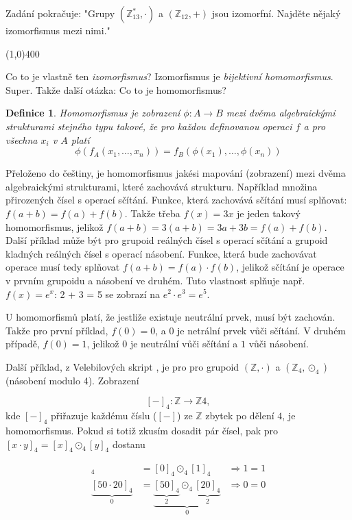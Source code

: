 \documentclass{article}
\newtheorem{definice}{Definice}[section]
\begin{document}
Zadání pokračuje:
"Grupy $(\mathbb{Z}_{13}^{*},\cdot)$ a $(\mathbb{Z}_{12},+)$ jsou izomorfní. Najděte nějaký izomorfismus mezi nimi."

\line(1,0){400}

Co to je vlastně ten \textit{izomorfismus}? Izomorfismus je \textit{bijektivní homomorfismus}. Super. Takže další otázka: Co to je homomorfismus?

\begin{definice}
\label{def-homomorfismus}
Homomorfismus je zobrazení $\phi: A \rightarrow B$ mezi dvěma algebraickými strukturami stejného typu takové, že pro každou definovanou operaci $f$ a pro všechna $x_i$ v $A$ platí
$$\phi(f_A(x_1, \ldots, x_n)) = f_B(\phi(x_1), \ldots, \phi(x_n))$$
\end{definice}

Přeloženo do češtiny, je homomorfismus jakési mapování (zobrazení) mezi dvěma algebraickými strukturami, které zachovává strukturu. Například množina přirozených čísel s operací sčítání. Funkce, která zachovává sčítání musí splňovat: $f(a + b) = f(a) + f(b)$. Takže třeba $f(x) = 3x$ je jeden takový homomorfismus, jelikož $f(a + b) = 3(a + b) = 3a + 3b = f(a) + f(b)$. 
Další příklad může být pro grupoid reálných čísel s operací sčítání a grupoid kladných reálných čísel s operací násobení. Funkce, která bude zachovávat operace musí tedy splňovat $f(a + b) = f(a) \cdot f(b)$, jelikož sčítání je operace v prvním grupoidu a násobení ve druhém. Tuto vlastnost splňuje např. $f(x) = e^x$: 2 + 3 = 5 se zobrazí na $e^2 \cdot e^3 = e^5$.

U homomorfismů platí, že jestliže existuje neutrální prvek, musí být zachován. Takže pro první příklad, $f(0) = 0$, a $0$ je netrální prvek vůči sčítání. V druhém případě, $f(0) = 1$, jelikož $0$ je neutrální vůči sčítání a $1$ vůči násobení.

Další příklad, z Velebilových skript \cite{velebil}, je pro pro grupoid $(\mathbb{Z}, \cdot)$ a $(\mathbb{Z}_4, \odot_4)$ (násobení modulo 4). Zobrazení 

$$[-]_4 : \mathbb{Z} \rightarrow \mathbb{Z}4,$$
kde $[-]_4$ přiřazuje každému číslu ($[-]$) ze $\mathbb{Z}$ zbytek po dělení $4$, je homomorfismus. Pokud si totiž zkusím dosadit pár čísel, pak pro $[x \cdot y]_4 = [x]_4 \odot_4 [y]_4$ dostanu

\begin{align*}
[0 \cdot 1]_4 & = [0]_4 \odot_4 [1]_4 & \Rightarrow 1 = 1 \\
\underbrace{[50 \cdot 20]_4}_{0} & = \underbrace{\underbrace{[50]_4}_{2} \odot_4 \underbrace{[20]_4}_{2}}_{0} & \Rightarrow  0  = 0
\end{align*}
\end{document}
